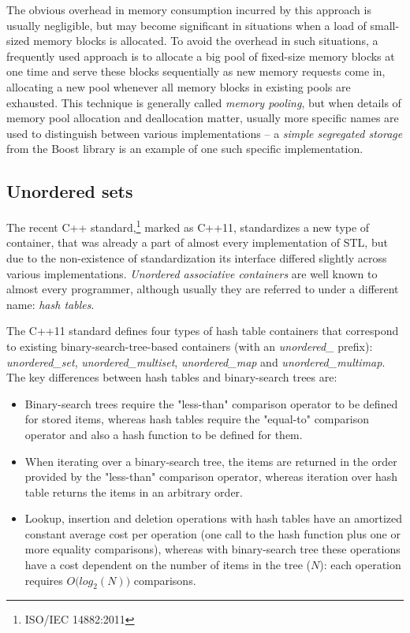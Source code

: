 The obvious overhead in memory consumption incurred by this approach is usually negligible,
but may become significant in situations when a load of small-sized memory blocks is allocated.
To avoid the overhead in such situations, a frequently used approach is to allocate a big pool of
fixed-size memory blocks at one time and serve these blocks sequentially as new memory requests
come in, allocating a new pool whenever all memory blocks in existing pools are exhausted.
This technique is generally called \emph{memory pooling}, but when details of
memory pool allocation and deallocation matter, usually more specific names are used to
distinguish between various implementations --  a \emph{simple segregated storage} from the Boost
library is an example of one such specific
implementation.


\subsection{Unordered sets}

The recent C++ standard,\footnote{ISO/IEC 14882:2011} marked as C++11, standardizes
a new type of container, that was already a part of almost every implementation of STL,
but due to the non-existence of standardization its interface differed slightly across
various implementations.
\emph{Unordered associative containers} are well known to almost every programmer,
although usually they are referred to under a different name: \emph{hash tables}.

The C++11 standard defines four types of hash table containers that correspond to existing
binary-search-tree-based containers (with an \emph{unordered_} prefix):
\emph{unordered_set}, \emph{unordered_multiset}, \emph{unordered_map} and \emph{unordered_multimap}.
The key differences between hash tables and binary-search trees are:
\begin{itemize}
  \item Binary-search trees require the "less-than" comparison operator to be defined for stored items,
  whereas hash tables require the "equal-to" comparison operator and also a hash function to be
  defined for them.
  \item When iterating over a binary-search tree, the items are returned in the order provided by
  the "less-than" comparison operator, whereas iteration over hash table returns the items in an arbitrary
  order.
  \item Lookup, insertion and deletion operations with hash tables have an amortized constant
  average cost per operation (one call to the hash function plus one or more equality comparisons),
  whereas with binary-search tree these operations have a cost dependent on the number of items
  in the tree ($N$): each operation requires $O\big(log_2(N)\big)$ comparisons.
\end{itemize}

